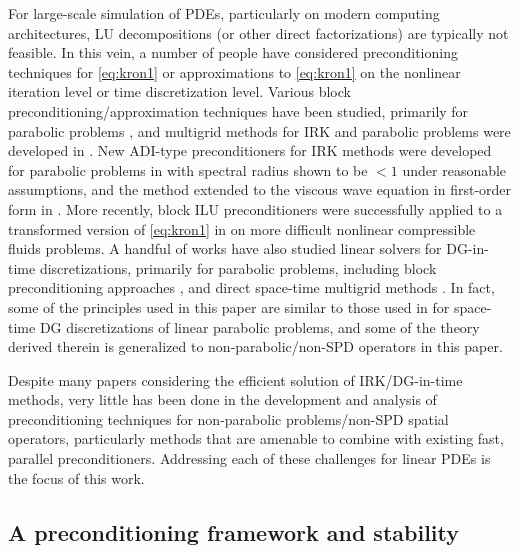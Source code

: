\documentclass[review]{siamart}
\begin{document}
For large-scale simulation of PDEs, particularly on modern computing architectures,
LU decompositions (or other direct factorizations) are typically not feasible. In this
vein, a number of people have considered preconditioning techniques for \eqref{eq:kron1}
or approximations to \eqref{eq:kron1} on the nonlinear iteration level or time
discretization level. Various block preconditioning/approximation techniques
have been studied, primarily for parabolic problems
\cite{houwen97b,Houwen97c,nissen11,mardel07,staff06,hoffmann97,jay00}, and
multigrid methods for IRK and parabolic problems were developed in \cite{vanlent05}.
New ADI-type preconditioners for IRK methods were developed for parabolic problems
in \cite{chen14} with spectral radius shown to be $<1$ under reasonable assumptions,
and the method extended to the viscous wave equation in first-order form in
\cite{chen16}. More recently, block ILU preconditioners were successfully applied
to a transformed version of \eqref{eq:kron1} in \cite{pazner17} on more difficult
nonlinear compressible fluids problems.
A handful of works have also studied linear solvers for DG-in-time discretizations,
primarily for parabolic problems, including block preconditioning approaches
\cite{exh,8jp,27n}, and direct space-time multigrid methods
\cite{gander2016analysis}. In fact, some of the principles used in this paper
are similar to those used in \cite{exh} for space-time DG discretizations of
linear parabolic problems, and some of the theory derived therein is generalized
to non-parabolic/non-SPD operators in this paper.

Despite many papers considering the efficient solution of IRK/DG-in-time methods,
very little has been done in the development and analysis of preconditioning techniques
for non-parabolic problems/non-SPD spatial operators, particularly methods that are
amenable to combine with existing fast, parallel preconditioners. Addressing each
of these challenges for linear PDEs is the focus of this work.

\subsection{A preconditioning framework and stability}\label{sec:intro:stab}
\end{document}
